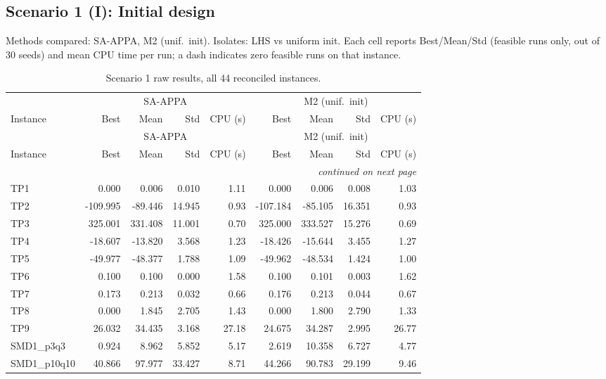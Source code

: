 \subsection{Scenario 1 (I): Initial design}
\label{app:scenario1}
Methods compared: SA-APPA, M2 (unif.\ init). Isolates: LHS vs uniform init. Each cell reports Best/Mean/Std (feasible runs only, out of 30 seeds) and mean CPU time per run; a dash indicates zero feasible runs on that instance.

\begingroup\scriptsize
\begin{longtable}{lrrrrrrrr}
\caption{Scenario 1 raw results, all 44 reconciled instances.}\label{tab:scenario1}\\
\toprule
 & \multicolumn{4}{c}{SA-APPA} & \multicolumn{4}{c}{M2 (unif.\ init)} \\
\cmidrule(lr){2-5} \cmidrule(lr){6-9}
Instance & Best & Mean & Std & CPU (s) & Best & Mean & Std & CPU (s) \\
\midrule
\endfirsthead
\toprule
 & \multicolumn{4}{c}{SA-APPA} & \multicolumn{4}{c}{M2 (unif.\ init)} \\
\cmidrule(lr){2-5} \cmidrule(lr){6-9}
Instance & Best & Mean & Std & CPU (s) & Best & Mean & Std & CPU (s) \\
\midrule
\endhead
\midrule\multicolumn{9}{r}{\emph{continued on next page}}\\\midrule
\endfoot
\bottomrule
\endlastfoot
TP1 & 0.000 & 0.006 & 0.010 & 1.11 & 0.000 & 0.006 & 0.008 & 1.03 \\
TP2 & -109.995 & -89.446 & 14.945 & 0.93 & -107.184 & -85.105 & 16.351 & 0.93 \\
TP3 & 325.001 & 331.408 & 11.001 & 0.70 & 325.000 & 333.527 & 15.276 & 0.69 \\
TP4 & -18.607 & -13.820 & 3.568 & 1.23 & -18.426 & -15.644 & 3.455 & 1.27 \\
TP5 & -49.977 & -48.377 & 1.788 & 1.09 & -49.962 & -48.534 & 1.424 & 1.00 \\
TP6 & 0.100 & 0.100 & 0.000 & 1.58 & 0.100 & 0.101 & 0.003 & 1.62 \\
TP7 & 0.173 & 0.213 & 0.032 & 0.66 & 0.176 & 0.213 & 0.044 & 0.67 \\
TP8 & 0.000 & 1.845 & 2.705 & 1.43 & 0.000 & 1.800 & 2.790 & 1.33 \\
TP9 & 26.032 & 34.435 & 3.168 & 27.18 & 24.675 & 34.287 & 2.995 & 26.77 \\
SMD1\_p3q3 & 0.924 & 8.962 & 5.852 & 5.17 & 2.619 & 10.358 & 6.727 & 4.77 \\
SMD1\_p10q10 & 40.866 & 97.977 & 33.427 & 8.71 & 44.266 & 90.783 & 29.199 & 9.46 \\

\end{longtable}
